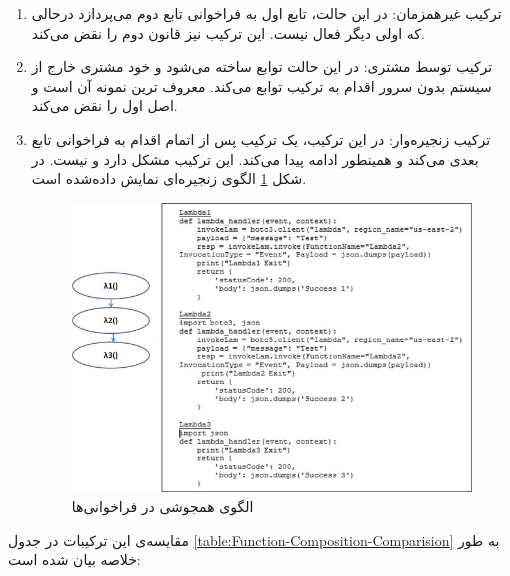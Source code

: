 \begin{enumerate}
	
	\item ترکیب غیرهمزمان: در این حالت،‌ تابع اول به فراخوانی تابع دوم می‌پردازد درحالی که اولی دیگر فعال نیست. این ترکیب نیز قانون دوم  را نقض می‌کند. 
	
	\item ترکیب توسط مشتری: در این حالت توابع ساخته می‌شود و خود مشتری خارج از سیستم بدون سرور اقدام به ترکیب توابع می‌کند. معروف ترین نمونه آن  است و اصل اول را نقض می‌کند. 
	
	\item ترکیب زنجیره‌وار: در این ترکیب، یک ترکیب پس از اتمام اقدام به فراخوانی تابع بعدی می‌کند و همینطور ادامه پیدا می‌کند. این ترکیب مشکل  دارد و  نیست. در شکل \ref{fig:FaaS-Chaining-Pattern} الگوی زنجیره‌ای نمایش داده‌شده است. 
	
	\begin{figure}
		\centering
		\includegraphics[width=\linewidth]{figs/FaaS-Chaining-Pattern}
		\caption {الگوی همجوشی در فراخوانی‌ها}
		\label{fig:FaaS-Chaining-Pattern}
	\end{figure}
	
\end{enumerate}

مقایسه‌ی این ترکیبات در جدول \ref{table:Function-Composition-Comparision} به طور خلاصه بیان شده است:‌


